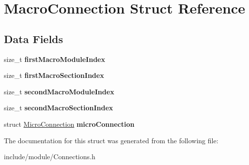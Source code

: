 \hypertarget{struct_macro_connection}{}\section{Macro\+Connection Struct Reference}
\label{struct_macro_connection}
\subsection*{Data Fields}
\begin{DoxyCompactItemize}
\item 
\hypertarget{struct_macro_connection_a81b79789265aded2ce3e8c3b7acb83a1}{}\label{struct_macro_connection_a81b79789265aded2ce3e8c3b7acb83a1} 
size\+\_\+t {\bfseries first\+Macro\+Module\+Index}
\item 
\hypertarget{struct_macro_connection_acb52f2b688edf8ad24e62f355db8a22f}{}\label{struct_macro_connection_acb52f2b688edf8ad24e62f355db8a22f} 
size\+\_\+t {\bfseries first\+Macro\+Section\+Index}
\item 
\hypertarget{struct_macro_connection_a5feea13d0b6c44d0b3a994084a9aae7d}{}\label{struct_macro_connection_a5feea13d0b6c44d0b3a994084a9aae7d} 
size\+\_\+t {\bfseries second\+Macro\+Module\+Index}
\item 
\hypertarget{struct_macro_connection_af558eb53c0c898d6e8f1af11dc1d3854}{}\label{struct_macro_connection_af558eb53c0c898d6e8f1af11dc1d3854} 
size\+\_\+t {\bfseries second\+Macro\+Section\+Index}
\item 
\hypertarget{struct_macro_connection_ac924f0083ced3c7d152081efbe458150}{}\label{struct_macro_connection_ac924f0083ced3c7d152081efbe458150} 
struct \hyperlink{struct_micro_connection}{Micro\+Connection} {\bfseries micro\+Connection}
\end{DoxyCompactItemize}


The documentation for this struct was generated from the following file\+:\begin{DoxyCompactItemize}
\item 
include/module/Connections.\+h\end{DoxyCompactItemize}
